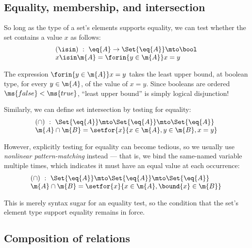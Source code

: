 
\subsection{Equality, membership, and intersection}

So long as the type of a set's elements supports equality, we can test whether
the set contains a value $x$ as follows:
\[\begin{array}{l}
(\isin) ~:~ \eq{A} \uto \Set{\eq{A}} \mto \bool\\
x \isin \m{A} = \forin{y \in \m{A}} x = y
\end{array}\]

The expression $\forin{y \in \m{A}} x = y$ takes the least upper bound, at
boolean type, for every $y \in \m{A}$, of the value of $x = y$. Since booleans
are ordered $\ms{false} < \ms{true}$, ``least upper bound'' is simply logical
disjunction! %

Similarly, we can define set intersection by testing for equality:
\[\begin{array}{l}
(\cap) ~:~ \Set{\eq{A}} \mto \Set{\eq{A}} \mto \Set{\eq{A}}\\
\m{A} \cap \m{B} = \setfor{x}{x \in \m{A}, y \in \m{B}, x = y}
\end{array}\]


However, explicitly testing for equality can become tedious, so we usually use
\emph{nonlinear pattern-matching} instead --- that is, we bind the same-named
variable multiple times, which indicates it must have an equal value at each
occurrence:
\[\begin{array}{l}
(\cap) ~:~ \Set{\eq{A}} \mto \Set{\eq{A}} \mto \Set{\eq{A}}\\
\m{A} \cap \m{B} = \setfor{x}{x \in \m{A}, \bound{x} \in \m{B}}
\end{array}\]

This is merely syntax sugar for an equality test, so the condition that the
set's element type support equality remains in force.



\subsection{Composition of relations}

